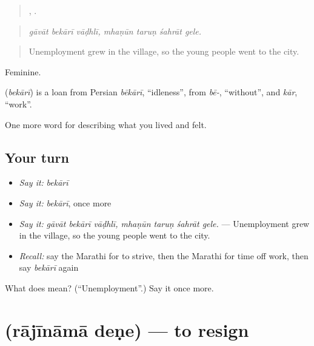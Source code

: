 \begin{quote}
  ,    .
\end{quote}

\begin{quote}
\emph{gāvāt bekārī vāḍhlī, mhaṇūn taruṇ śahrāt gele.}
\end{quote}

\begin{quote}
Unemployment grew in the village, so the young people went to the city.
\end{quote}

Feminine.

\begin{cousinweb}
\textbf{} (\emph{bekārī}) is a loan from Persian \emph{bēkārī}, \textquotedblleft{}idleness\textquotedblright{}, from \emph{bē-}, \textquotedblleft{}without\textquotedblright{}, and \emph{kār}, \textquotedblleft{}work\textquotedblright{}.
\end{cousinweb}

\begin{grammarlens}[title={What you've built}]
One more word for describing what you lived and felt.
\end{grammarlens}

\subsection*{Your turn}
\begin{itemize}
\raggedright
  \item \emph{Say it:} \emph{bekārī}
  \item \emph{Say it:} \emph{bekārī}, once more
  \item \emph{Say it:} \emph{gāvāt bekārī vāḍhlī, mhaṇūn taruṇ śahrāt gele.} — Unemployment grew in the village, so the young people went to the city.
  \item \emph{Recall:} say the Marathi for to strive, then the Marathi for time off work, then say \emph{bekārī} again
\end{itemize}

\begin{tcolorbox}[breakable,colback=teal!4,colframe=teal!35!black,title={Before you move on}]
What does  mean? (\textquotedblleft{}Unemployment\textquotedblright{}.) Say it once more.
\end{tcolorbox}
\section[\texorpdfstring{\mr{राजीनामा} \mr{देणे} (rājīnāmā deṇe)}{राजीनामा देणे (rājīnāmā deṇe)}]{  (rājīnāmā deṇe) — to resign}

